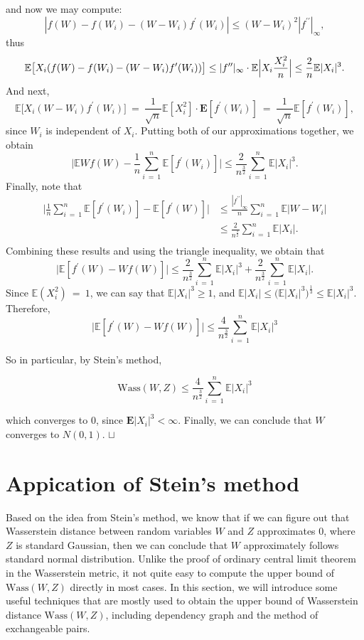 \documentclass[12pt]{article}
\newcommand\qed{\hfill\hbox{\rlap{$\sqcap$}$\sqcup$}}
\newcommand{\eq }{\: = \:}
\theoremstyle{nonumberplain}
\begin{document}
and now we may compute:
$$
|f(W)-f(W_{i})-(W-W_{i})f^{\prime}(W_{i})|\leq (W-W_{i})^{2} |f^{\prime \prime}|_{\infty},
$$
thus
$$
\mathbb{E}\bigl[X_{i}(f(W)-f(W_{i})-(W-W_{i})f^{\prime}(W_{i})) \bigr]\leq |f^{\prime \prime}|_{\infty}\cdot \mathbb{E}\Bigl|X_{i} \frac{X_{i}^{2}}{n}\Bigr|\leq \frac{2}{n} \mathbb{E}|X_{i}|^{3}.
$$
And next,
$$
\mathbb{E}\bigl[X_{i}(W-W_{i})f^{\prime}(W_{i}) \bigr]\eq \frac{1}{\sqrt{n}}\mathbb{E}[X_{i}^{2}]\cdot \mathbf{E}[f^{\prime}(W_{i})]\eq \frac{1}{\sqrt{n}} \mathbb{E}[f^{\prime}(W_{i})],
$$
since $W_{i}$ is independent of $X_{i}$.
Putting both of our approximations together, we obtain
$$
\bigl|\mathbb{E} Wf(W)-\frac{1}{n} \sum
_{i\eq 1}^{n} \mathbb{E}[f^{\prime}(W_{i})] \bigr|\leq \frac{2}{n^{\frac{3}{2}}} \sum_{i\eq 1}^{n} \mathbb{E}|X_i|^{3}.
$$
Finally, note that 
\begin{align*}
\bigl|\frac{1}{n} \sum_{i\eq 1}^{n} \mathbb{E}[f^{\prime}(W_{i})] - \mathbb{E}[f^{\prime}(W)]  \bigr| &\leq \frac{|f^{\prime \prime}|_{\infty}}{n} \sum_{i\eq 1}^{n} \mathbb{E}|W-W_{i}|\\
&\leq \frac{2}{n^{\frac{3}{2}}} \sum_{i\eq 1}^{n} \mathbb{E}|X_{i}|.\\
\end{align*}
Combining these results and using the triangle inequality, we obtain that
$$
\bigl|\mathbb{E}[f^{\prime}(W)-Wf(W)] \bigr|\leq \frac{2}{n^{\frac{3}{2}}} \sum_{i\eq 1}^{n} \mathbb{E}|X_i|^{3} + \frac{2}{n^{\frac{3}{2}}} \sum_{i\eq 1}^{n} \mathbb{E}|X_{i}|.
$$
Since $\mathbb{E}(X_{i}^{2})\eq 1$, we can say that $\mathbb{E}|X_{i}|^{3}\geq 1 $, and $\mathbb{E}|X_{i}|\leq \bigl(\mathbb{E}|X_{i}|^{3} \bigr)^{\frac{1}{3}}\leq \mathbb{E}|X_{i}|^{3}$.
Therefore,
$$
\bigl|\mathbb{E}[f^{\prime}(W)-Wf(W)] \bigr| \leq \frac{4}{n^{\frac{3}{2}}} \sum_{i\eq 1}^{n} \mathbb{E}|X_i|^{3}
$$

So in particular, by Stein's method,

$$
\mathrm{Wass}(W, Z) \leq \frac{4}{n^{\frac{3}{2}}} \sum_{i\eq 1}^{n} \mathbb{E}|X_i|^{3}
$$

which converges to $0$, since $\mathbf{E}|X_i|^{3}< \infty$. Finally, we can conclude that $W$ converges to $N(0,1)$.
\qed

\section{Appication of Stein's method}

Based on the idea from Stein's method, we know that if we can figure out that Wasserstein distance between random variables $W$ and $Z$ approximates 0, where $Z$ is standard Gaussian, then we can conclude that $W$ approximately follows standard normal distribution. Unlike the proof of ordinary central limit theorem in the Wasserstein metric, it not quite easy to compute the upper bound of $\mathrm{Wass}(W,Z)$ directly in most cases. In this section, we will introduce some useful techniques that are mostly used to obtain the upper bound of Wasserstein distance $\mathrm{Wass}(W,Z)$, including dependency graph and the method of exchangeable pairs.
\end{document}
